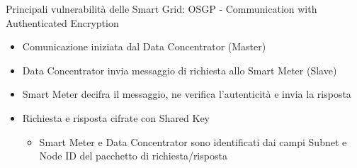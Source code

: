 \begin{frame}{Principali vulnerabilità delle Smart Grid: OSGP - Communication with Authenticated Encryption}
	\begin{itemize}[<+- | alert@+>]
		\item Comunicazione iniziata dal Data Concentrator (Master)
		\item Data Concentrator invia messaggio di richiesta allo Smart Meter (Slave)
		\item Smart Meter decifra il messaggio, ne verifica l'autenticità e invia la risposta
		\item Richiesta e risposta cifrate con Shared Key
		\begin{itemize}
			\item Smart Meter e Data Concentrator sono identificati dai campi Subnet e Node ID del pacchetto di richiesta/risposta
		\end{itemize}
	\end{itemize}
\end{frame}

